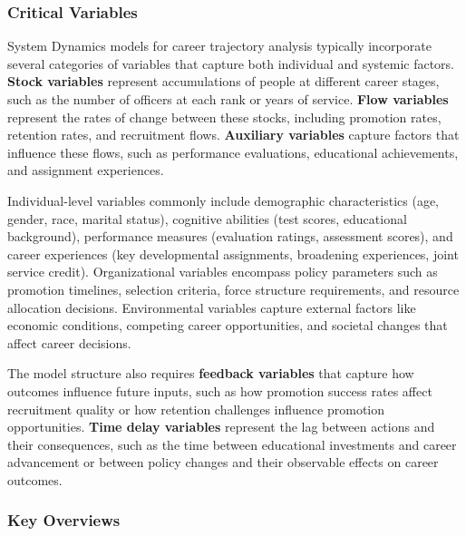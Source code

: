 \documentclass[main.tex]{subfiles}
\begin{document}
\subsubsection{Critical Variables}

System Dynamics models for career trajectory analysis typically incorporate several categories of variables that capture both individual and systemic factors. \textbf{Stock variables} represent accumulations of people at different career stages, such as the number of officers at each rank or years of service\parencite{systems_analysis}. \textbf{Flow variables} represent the rates of change between these stocks, including promotion rates, retention rates, and recruitment flows\parencite{systems_analysis}. \textbf{Auxiliary variables} capture factors that influence these flows, such as performance evaluations, educational achievements, and assignment experiences.

Individual-level variables commonly include demographic characteristics (age, gender, race, marital status), cognitive abilities (test scores, educational background), performance measures (evaluation ratings, assessment scores), and career experiences (key developmental assignments, broadening experiences, joint service credit)\parencite{army_indicators,dulce_thesis}. Organizational variables encompass policy parameters such as promotion timelines, selection criteria, force structure requirements, and resource allocation decisions. Environmental variables capture external factors like economic conditions, competing career opportunities, and societal changes that affect career decisions.

The model structure also requires \textbf{feedback variables} that capture how outcomes influence future inputs, such as how promotion success rates affect recruitment quality or how retention challenges influence promotion opportunities\parencite{ibm_workforce}. \textbf{Time delay variables} represent the lag between actions and their consequences, such as the time between educational investments and career advancement or between policy changes and their observable effects on career outcomes\parencite{systems_analysis}.

\subsubsection{Key Overviews}

\end{document}
